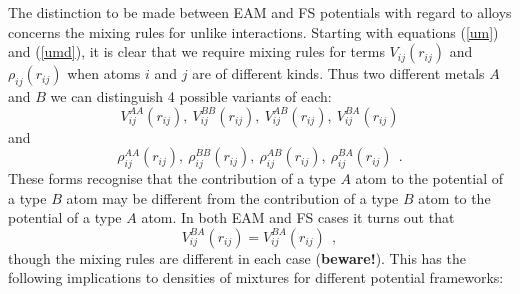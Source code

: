 The distinction to be made between EAM and FS potentials with regard to
alloys concerns the mixing rules for unlike interactions.  Starting with
equations (\ref{um}) and (\ref{umd}), it is clear that we require mixing
rules for terms $V_{ij}(r_{ij})$ and $\rho_{ij}(r_{ij})$ when atoms $i$
and $j$ are of different kinds.  Thus two different metals $A$ and $B$ we
can distinguish 4 possible variants of each:
\[V^{AA}_{ij}(r_{ij}),~V^{BB}_{ij}(r_{ij}),~V^{AB}_{ij}(r_{ij}),
~V^{BA}_{ij}(r_{ij})\]
and
\[\rho^{AA}_{ij}(r_{ij}),~\rho^{BB}_{ij}(r_{ij}),~\rho^{AB}_{ij}(r_{ij}),
~\rho^{BA}_{ij}(r_{ij})~~.\]
These forms recognise that the contribution of a type $A$ atom to
the potential of a type $B$ atom may be different from the
contribution of a type $B$ atom to the potential of a type $A$ atom.
In both EAM \cite{johnson-89a} and FS \cite{sutton-91a} cases it
turns out that
\begin{equation}
V^{BA}_{ij}(r_{ij})=V^{BA}_{ij}(r_{ij})~~,
\end{equation}
though the mixing rules are different in each case ({\bf beware!}).
This has the following implications to densities of mixtures
for different potential frameworks:
